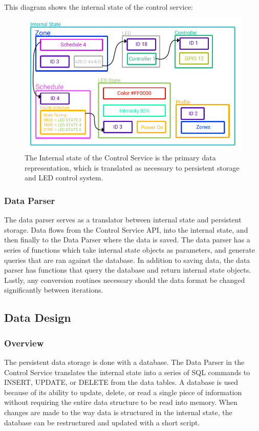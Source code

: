 \documentclass[onecolumn, draftclsnofoot,10pt, compsoc]{IEEEtran}
\begin{document}
			\noindent \\This diagram shows the internal state of the control service:

			\begin{center}
				\begin{figure}[H]
					\includegraphics[width=\linewidth]{systemDiagrams/internalstate.png}
					\caption{The Internal state of the Control Service is the primary data representation, which is translated as necessary to persistent storage and LED control system.}
					\label{fig:internalStateDiagram}
				\end{figure}
			\end{center}

			\subsubsection{Data Parser}
			The data parser serves as a translator between internal state and persistent storage.
			Data flows from the Control Service API, into the internal state, and then finally to the Data Parser where the data is saved.
			The data parser has a series of functions which take internal state objects as parameters, and generate queries that are ran against the database.
			In addition to saving data, the data parser has functions that query the database and return internal state objects.
			Lastly, any conversion routines necessary should the data format be changed significantly between iterations.


		\subsection{Data Design}
			\subsubsection{Overview}
			The persistent data storage is done with a database.
			The Data Parser in the Control Service translates the internal state into a series of SQL commands to INSERT, UPDATE, or DELETE from the data tables.
			A database is used because of its ability to update, delete, or read a single piece of information without requiring the entire data structure to be read into memory.
			When changes are made to the way data is structured in the internal state, the database can be restructured and updated with a short script.
\end{document}
